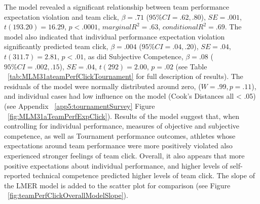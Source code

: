      \bigskip

The model revealed a significant relationship between team performance expectation violation and team click, $\beta = .71$ ($95\% CI = .62, .80$), $SE = .001$, $t(193.20) = 16.29$, $p < .0001$, $marginal R^2 = .63$, $conditional R^2 = .69$.
The model also indicated that individual performance expectation violation significantly predicted team click, $\beta = .004$ ($95\% CI =  .04, .20$), $SE = .04$, $t(311.7) = 2.81$, $p < .01$, as did Subjective Competence, $\beta = .08$ ($95\% CI =  .002, .15$), $SE = .04$, $t(292) = 2.00$, $p = .02$  (see Table ~\ref{tab:MLM31ateamPerfClickTournament} for full description of results).
The residuals of the model were normally distributed around zero, ($W = .99, p = .11$), and individual cases had low influence on the model (Cook's Distances all < .05) (see Appendix ~\ref{app5:tournamentSurvey} Figure ~\ref{fig:MLM31aTeamPerfExpClick}).
Results of the model suggest that, when controlling for individual performance, measures of objective and subjective competence, as well as Tournament performance outcomes, athletes whose expectations around team performance were more positively violated also experienced stronger feelings of team click. Overall, it also appears that more positive expectations about individual performance, and higher levels of self-reported technical competence predicted higher levels of team click.  The slope of the LMER model is added to the scatter plot for comparison (see Figure ~\ref{fig:teamPerfClickOverallModelSlope}).

   


